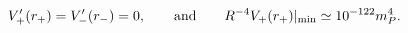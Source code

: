 \begin{equation}
    \label{RCapprox}
    V_+'(r_+)= V_-'(r_-)=0,
    \qquad\text{and}\qquad
    {R^{-4}} V_+(r_+)|_{\rm min} \simeq 10^{-122} m_P^4.
\end{equation}

